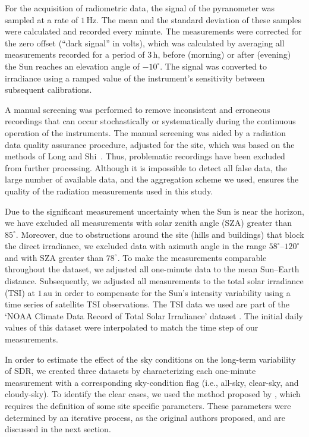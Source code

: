 \documentclass[applsci,article,submit,moreauthors,pdftex]{Definitions/mdpi}
\begin{document}
For the acquisition of radiometric data, the signal of the pyranometer
was sampled at a rate of \(1\,\text{Hz}\). The mean and the standard
deviation of these samples were calculated and recorded every minute.
The measurements were corrected for the zero offset (``dark signal'' in
volts), which was calculated by averaging all measurements recorded for
a period of \(3\,\text{h}\), before (morning) or after (evening) the Sun
reaches an elevation angle of \(-10^\circ\). The signal was converted to
irradiance using a ramped value of the instrument's sensitivity between
subsequent calibrations.

A manual screening was performed to remove inconsistent and erroneous
recordings that can occur stochastically or systematically during the
continuous operation of the instruments. The manual screening was aided
by a radiation data quality assurance procedure, adjusted for the site,
which was based on the methods of Long and
Shi~\citep{Long2006, Long2008a}. Thus, problematic recordings have been
excluded from further processing. Although it is impossible to detect
all false data, the large number of available data, and the aggregation
scheme we used, ensures the quality of the radiation measurements used
in this study.

Due to the significant measurement uncertainty when the Sun is near the
horizon, we have excluded all measurements with solar zenith angle (SZA)
greater than \(85^\circ\). Moreover, due to obstructions around the site
(hills and buildings) that block the direct irradiance, we excluded data
with azimuth angle in the range \(58^{\circ}\)--\(120^{\circ}\) and with
SZA greater than \(78^{\circ}\). To make the measurements comparable
throughout the dataset, we adjusted all one-minute data to the mean
Sun--Earth distance. Subsequently, we adjusted all measurements to the
total solar irradiance (TSI) at \(1\,\text{au}\) in order to compensate
for the Sun's intensity variability using a time series of satellite TSI
observations. The TSI data we used are part of the `NOAA Climate Data
Record of Total Solar Irradiance' dataset \citep{Coddington2005}. The
initial daily values of this dataset were interpolated to match the time
step of our measurements.

In order to estimate the effect of the sky conditions on the long-term
variability of SDR, we created three datasets by characterizing each
one-minute measurement with a corresponding sky-condition flag (i.e.,
all-sky, clear-sky, and cloudy-sky). To identify the clear cases, we
used the method proposed by \citet{Reno2016}, which requires the
definition of some site specific parameters. These parameters were
determined by an iterative process, as the original authors proposed,
and are discussed in the next section.
\end{document}
